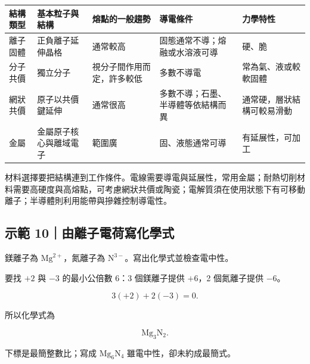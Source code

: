 \documentclass[11pt,a4paper]{article}
\newcounter{none}
\begin{document}
{\def\LTcaptype{none} %
\begin{longtable}[]{@{}
  >{\raggedright\arraybackslash}p{}
  >{\raggedright\arraybackslash}p{}
  >{\raggedright\arraybackslash}p{}
  >{\raggedright\arraybackslash}p{}
  >{\raggedright\arraybackslash}p{}@{}}
\toprule\noalign{}
\begin{minipage}[b]{\linewidth}\raggedright
結構類型
\end{minipage} & \begin{minipage}[b]{\linewidth}\raggedright
基本粒子與結構
\end{minipage} & \begin{minipage}[b]{\linewidth}\raggedright
熔點的一般趨勢
\end{minipage} & \begin{minipage}[b]{\linewidth}\raggedright
導電條件
\end{minipage} & \begin{minipage}[b]{\linewidth}\raggedright
力學特性
\end{minipage} \\
\midrule\noalign{}
\endhead
\bottomrule\noalign{}
\endlastfoot
離子固體 & 正負離子延伸晶格 & 通常較高 & 固態通常不導；熔融或水溶液可導 & 硬、脆 \\
分子共價 & 獨立分子 & 視分子間作用而定，許多較低 & 多數不導電 & 常為氣、液或較軟固體 \\
網狀共價 & 原子以共價鍵延伸 & 通常很高 & 多數不導；石墨、半導體等依結構而異 & 通常硬，層狀結構可較易滑動 \\
金屬 & 金屬原子核心與離域電子 & 範圍廣 & 固、液態通常可導 & 有延展性，可加工 \\
\end{longtable}
}

材料選擇要把結構連到工作條件。電線需要導電與延展性，常用金屬；耐熱切削材料需要高硬度與高熔點，可考慮網狀共價或陶瓷；電解質須在使用狀態下有可移動離子；半導體則利用能帶與摻雜控制導電性。

\begin{HandoutWorkedExample}

\subsection{示範 10｜由離子電荷寫化學式}\label{ux793aux7bc4-10ux7531ux96e2ux5b50ux96fbux8377ux5bebux5316ux5b78ux5f0f}

鎂離子為 \(\mathrm{Mg}^{2+}\)，氮離子為 \(\mathrm N^{3-}\)。寫出化學式並檢查電中性。

要找 \(+2\) 與 \(-3\) 的最小公倍數 6：3 個鎂離子提供 \(+6\)，2 個氮離子提供 \(-6\)。

\[
3(+2)+2(-3)=0.
\]

所以化學式為

\[
\boxed{\mathrm{Mg_3N_2}}.
\]

下標是最簡整數比；寫成 \(\mathrm{Mg_6N_4}\) 雖電中性，卻未約成最簡式。

\end{HandoutWorkedExample}
\end{document}
